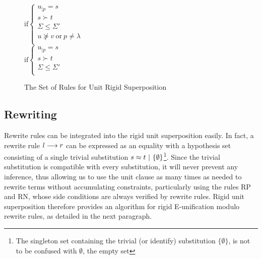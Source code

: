 \begin{figure}[htb]
\begin{center}
\doubleLine{}
\DP
$\text{if} \left\{\begin{array}{l}
u_{|p} = s\\
s \succ t\\
\Sigma \leq \Sigma'\\
u \not\succeq v ~ \text{or} ~ p \neq \lambda\\
\end{array}\right.$\\[12pt]

\doubleLine{}
\DP
$\text{if} \left\{\begin{array}{l}
u_{|p} = s\\
s \succ t\\
\Sigma \leq \Sigma'\\
\end{array}\right.$
\caption{The Set of Rules for Unit Rigid Superposition}
\label{fig:unit-sup-rules}
\end{center}
\end{figure}

\subsection{Rewriting}

Rewrite rules can be integrated into the rigid unit superposition easily. In fact,
a rewrite rule $l\longrightarrow{}r$ can be expressed as an equality with a hypothesis set
consisting of a single trivial substitution
$s\approx{}t ~|~ \{\emptyset\}$\footnote{The singleton set containing the trivial
(or identify) substitution $\{\emptyset\}$, is not to be confused with $\emptyset$, the empty set}.
Since the trivial substitution is compatible
with every substitution, it will never prevent any inference, thus allowing us
to use the unit clause as many times as needed to rewrite terms without
accumulating constraints, particularly using the rules RP and RN, whose side
conditions are always verified by rewrite rules. Rigid unit superposition
therefore provides an algorithm for rigid E-unification modulo rewrite rules,
as detailed in the next paragraph.

